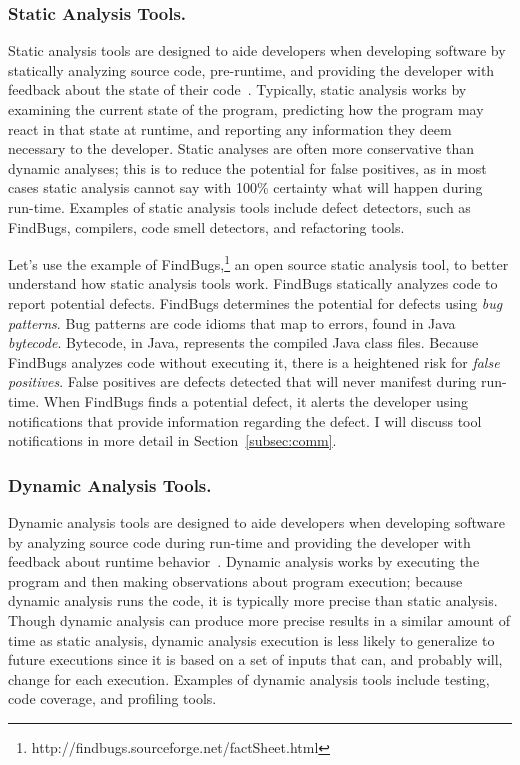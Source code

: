 \documentclass{llncs}
\begin{document}
\subsubsection{Static Analysis Tools.}

Static analysis tools are designed to aide developers when developing software by statically analyzing source code, pre-runtime, and providing the developer with feedback about the state of their code~\cite{ernst2003static}.
Typically, static analysis works by examining the current state of the program, predicting how the program may react in that state at runtime, and reporting any information they deem necessary to the developer. Static analyses are often more conservative than dynamic analyses; this is to reduce the potential for false positives, as in most cases static analysis cannot say with 100\% certainty what will happen during run-time. 
Examples of static analysis tools include defect detectors, such as FindBugs, compilers, code smell detectors, and refactoring tools.

Let's use the example of FindBugs,\footnote{http://findbugs.sourceforge.net/factSheet.html} an open source static analysis tool, to better understand how static analysis tools work. FindBugs statically analyzes code to report potential defects. FindBugs determines the potential for defects using \emph{bug patterns}. Bug patterns are code idioms that map to errors, found in Java \emph{bytecode}. Bytecode, in Java, represents the compiled Java class files. Because FindBugs analyzes code without executing it, there is a heightened risk for \emph{false positives}. False positives are defects detected that will never manifest during run-time. When FindBugs finds a potential defect, it alerts the developer using notifications that provide information regarding the defect. I will discuss tool notifications in more detail in Section~\ref{subsec:comm}.


\subsubsection{Dynamic Analysis Tools.}

Dynamic analysis tools are designed to aide developers when developing software by analyzing source code during run-time and providing the developer with feedback about runtime behavior~\cite{ernst2003static}.
Dynamic analysis works by executing the program and then making observations about program execution; because dynamic analysis runs the code, it is typically more precise than static analysis. Though dynamic analysis can produce more precise results in a similar amount of time as static analysis, dynamic analysis execution is less likely to generalize to future executions since it is based on a set of inputs that can, and probably will, change for each execution.
Examples of dynamic analysis tools include testing, code coverage, and profiling tools.
\end{document}
